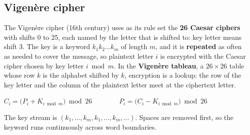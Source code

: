 \subsection{Vigen\`ere cipher \hot}
The Vigen\`ere cipher (16th century) uses as its rule set the \textbf{26 Caesar ciphers} with shifts 0 to 25, each named by the letter that  is shifted to: key letter  means shift 3. The key is a keyword $k_1 k_2 \dots k_m$ of length $m$, and it is \textbf{repeated} as often as needed to cover the message, so plaintext letter $i$ is encrypted with the Caesar cipher chosen by key letter $i \bmod m$. In the \textbf{Vigen\`ere tableau}, a $26 \times 26$ table whose row $k$ is the alphabet shifted by $k$, encryption is a lookup: the row of the key letter and the column of the plaintext letter meet at the ciphertext letter.
\begin{center}
$C_i = \big(P_i + K_{i \bmod m}\big) \bmod 26 \qquad\qquad P_i = \big(C_i - K_{i \bmod m}\big) \bmod 26$
\end{center}
The key stream is $(k_1, \dots, k_m, k_1, \dots, k_m, \dots)$. Spaces are removed first, so the keyword runs continuously across word boundaries.

